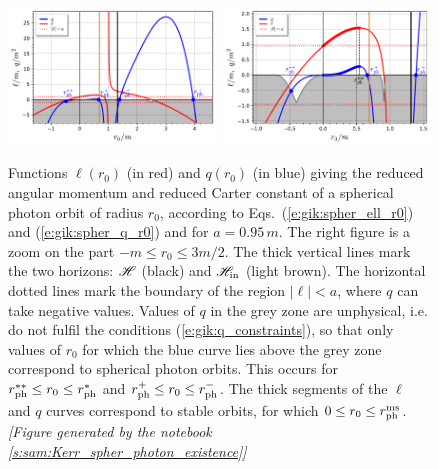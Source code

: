 \begin{figure}
\centerline{\includegraphics[width=0.49\textwidth]{gik_spher_orb_exist.pdf}\
\includegraphics[width=0.49\textwidth]{gik_spher_orb_exist_zoom.pdf}}
\caption[]{\label{f:gik:spher_orb_exist} \footnotesize
Functions $\ell(r_0)$ (in red) and $q(r_0)$ (in blue) giving the reduced angular momentum
and reduced Carter constant of a spherical photon orbit of radius $r_0$,
according to Eqs.~(\ref{e:gik:spher_ell_r0}) and (\ref{e:gik:spher_q_r0})
and for $a=0.95\, m$. The right figure is a zoom on the part
$-m\leq r_0 \leq 3m/2$. The thick vertical lines
mark the two horizons: $\mathscr{H}$ (black) and $\mathscr{H}_{\rm in}$ (light brown).
The horizontal dotted lines mark the boundary of the region $|\ell|<a$,
where $q$ can take negative values. Values of $q$ in the grey zone
are unphysical, i.e. do not fulfil the conditions (\ref{e:gik:q_constraints}),
so that only values of $r_0$ for which the blue curve lies
above the grey zone correspond to spherical photon orbits. This occurs
for $r_{\rm ph}^{**} \leq r_0 \leq r_{\rm ph}^*$ and $r_{\rm ph}^+ \leq r_0 \leq r_{\rm ph}^-$.
The thick segments of the $\ell$ and $q$ curves correspond to stable orbits, for
which $0\leq r_0\leq r_{\rm ph}^{\rm ms}$.
\textsl{[Figure generated by the notebook \ref{s:sam:Kerr_spher_photon_existence}]}
}
\end{figure}

